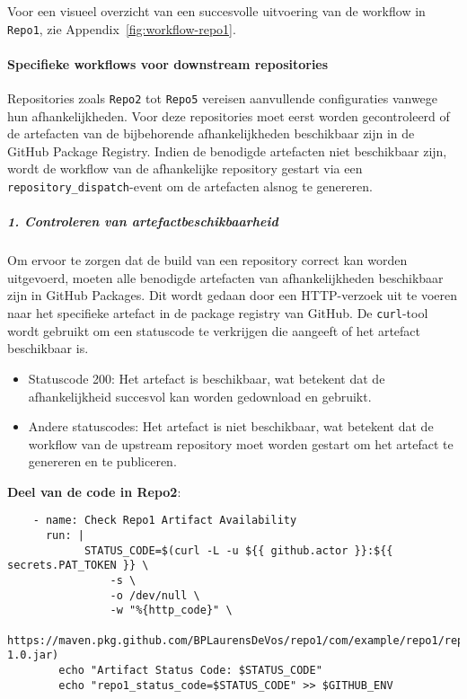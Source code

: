 Voor een visueel overzicht van een succesvolle uitvoering van de workflow in \texttt{Repo1}, zie Appendix~\ref{fig:workflow-repo1}.

\paragraph{Specifieke workflows voor downstream repositories}
Repositories zoals \texttt{Repo2} tot \texttt{Repo5} vereisen aanvullende configuraties vanwege hun afhankelijkheden. Voor deze repositories moet eerst worden gecontroleerd of de artefacten van de bijbehorende afhankelijkheden beschikbaar zijn in de GitHub Package Registry. Indien de benodigde artefacten niet beschikbaar zijn, wordt de workflow van de afhankelijke repository gestart via een \texttt{repository\_dispatch}-event om de artefacten alsnog te genereren.

\subparagraph{1. Controleren van artefactbeschikbaarheid}
Om ervoor te zorgen dat de build van een repository correct kan worden uitgevoerd, moeten alle benodigde artefacten van afhankelijkheden beschikbaar zijn in GitHub Packages. Dit wordt gedaan door een HTTP-verzoek uit te voeren naar het specifieke artefact in de package registry van GitHub. De \texttt{curl}-tool wordt gebruikt om een statuscode te verkrijgen die aangeeft of het artefact beschikbaar is.

\begin{itemize} 
    \item Statuscode 200: Het artefact is beschikbaar, wat betekent dat de afhankelijkheid succesvol kan worden gedownload en gebruikt. \item Andere statuscodes: Het artefact is niet beschikbaar, wat betekent dat de workflow van de upstream repository moet worden gestart om het artefact te genereren en te publiceren. 
\end{itemize}

\textbf{Deel van de code in Repo2}:

\begin{verbatim}
    - name: Check Repo1 Artifact Availability
      run: |
            STATUS_CODE=$(curl -L -u ${{ github.actor }}:${{ secrets.PAT_TOKEN }} \
                -s \
                -o /dev/null \
                -w "%{http_code}" \
                https://maven.pkg.github.com/BPLaurensDeVos/repo1/com/example/repo1/repo1/1.0/repo1-1.0.jar)
        echo "Artifact Status Code: $STATUS_CODE"
        echo "repo1_status_code=$STATUS_CODE" >> $GITHUB_ENV
\end{verbatim}

